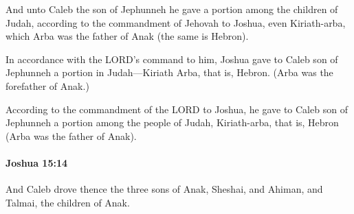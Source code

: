 			\begin{versebox}
					\item[BHS] 
					\item[ASV] And unto Caleb the son of Jephunneh he gave a portion among the children of Judah, according to the commandment of Jehovah to Joshua, even Kiriath-arba, which Arba was the father of Anak (the same is Hebron).
					\item[NIV] In accordance with the LORD’s command to him, Joshua gave to Caleb son of Jephunneh a portion in Judah—Kiriath Arba, that is, Hebron. (Arba was the forefather of Anak.)
					\item[NRSV] According to the commandment of the LORD to Joshua, he gave to Caleb son of Jephunneh a portion among the people of Judah, Kiriath-arba, that is, Hebron (Arba was the father of Anak).
			\end{versebox}

		\paragraph{Joshua 15:14} %
			\label{JOSHUA-15-14}

			And Caleb drove thence the three sons of Anak, Sheshai, and Ahiman, and Talmai, the children of Anak.

